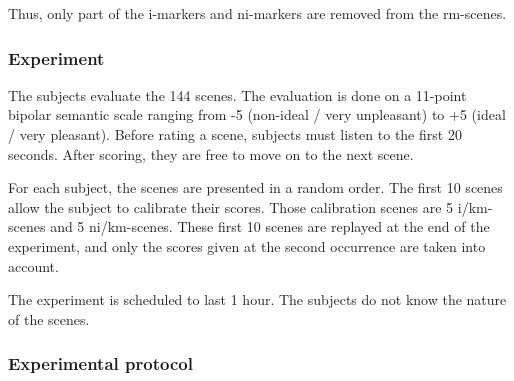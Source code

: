 \documentclass[12pt]{elsarticle}
\begin{document}
Thus, only part of the i-markers and ni-markers are removed from the rm-scenes.

\subsubsection*{Experiment}




The subjects evaluate the 144 scenes. The evaluation is done on a 11-point bipolar semantic scale ranging from -5 (non-ideal / very unpleasant) to +5 (ideal / very pleasant). Before rating a scene, subjects must listen to the first 20 seconds. After scoring, they are free to move on to the next scene.

For each subject, the scenes are presented in a random order. The first 10 scenes allow the subject to calibrate their scores. Those calibration scenes are  5 i/km-scenes and 5 ni/km-scenes. These first 10 scenes are replayed at the end of the experiment, and only the scores given at the second occurrence are taken into account.

The experiment is scheduled to last 1 hour. The subjects do not know the nature of the scenes.

\subsubsection*{Experimental protocol}

\end{document}
